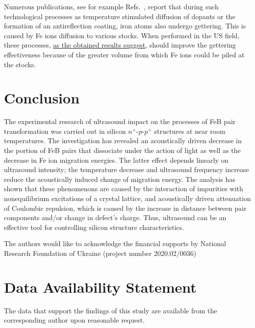 \documentclass[%
 aip,jap,
 amsmath,amssymb,
 reprint,%
]{revtex4-1}
\begin{document}
Numerous publications, see for example Refs.~, report that during such technological processes as temperature stimulated diffusion of dopants or the formation of an antireflection coating,
iron atoms also undergo gettering.
This is caused by Fe ions diffusion to various stocks.
When performed in the US field, these processes, \textcolor[rgb]{0.00,0.07,1.00}{\uline{as the obtained results suggest}},
should  improve the gettering effectiveness because of the greater volume from which
Fe ions could be piled at the stocks.

\section{Conclusion}
The experimental research of ultrasound impact on the processes of FeB pair transformation was carried out in silicon $n^+$-$p$-$p^+$ structures at near room temperatures.
The investigation has revealed an acoustically driven decrease in the portion of FeB pairs that dissociate under the action of light as well as the decrease in Fe ion migration energies.
The latter effect depends linearly on ultrasound intensity;
the temperature decrease and ultrasound frequency increase reduce the acoustically induced change of migration energy.
The analysis has shown that these phenomenons are caused by the interaction of impurities with nonequilibrium excitations of a crystal lattice,  and acoustically driven attenuation of Coulombic repulsion, which is caused by the increase in distance between pair components and/or change in defect's charge.
Thus, ultrasound can be an effective  tool for controlling silicon structure characteristics.


\begin{acknowledgments}
The authors would like to acknowledge the financial supports by National Research Foundation  of Ukraine
(project number 2020.02/0036)
\end{acknowledgments}

\section*{Data Availability Statement}

The data that support the findings of this study are available from the corresponding author upon reasonable request.
\end{document}
